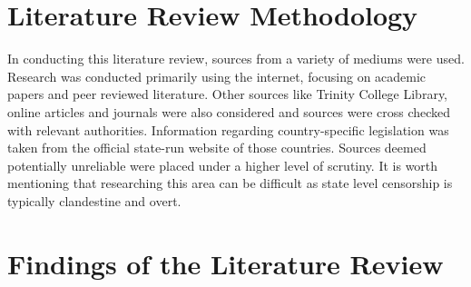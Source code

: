 \section{Literature Review Methodology}

In conducting this literature review, sources from a variety of mediums were used. Research was conducted primarily using the internet, focusing on academic papers and peer reviewed literature. Other sources like Trinity College Library, online articles and journals were also considered and sources were cross checked with relevant authorities. Information regarding country-specific legislation was taken from the official state-run website of those countries. Sources deemed potentially unreliable were placed under a higher level of scrutiny. It is worth mentioning that researching this area can be difficult as state level censorship is typically clandestine and overt. 



\section{Findings of the Literature Review}
